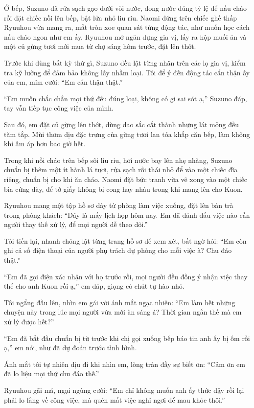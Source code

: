 \documentclass[../main.tex]{subfiles}
\begin{document}
Ở bếp, Suzuno đã rửa sạch gạo dưới vòi nước, đong nước đúng tỷ lệ để nấu cháo rồi đặt chiếc nồi lên bếp, bật lửa nhỏ liu riu. Naomi đứng trên chiếc ghế thấp Ryuuhou vừa mang ra, mắt tròn xoe quan sát từng động tác, như muốn học cách nấu cháo ngon như em ấy. Ryuuhou mở ngăn đựng gia vị, lấy ra hộp muối ăn và một củ gừng tươi mới mua từ chợ sáng hôm trước, đặt lên thớt.

Trước khi dùng bất kỳ thứ gì, Suzuno đều lật từng nhãn trên các lọ gia vị, kiểm tra kỹ lưỡng để đảm bảo không lấy nhầm loại. Tôi để ý đến động tác cẩn thận ấy của em, mỉm cười: ``Em cẩn thận thật.''

``Em muốn chắc chắn mọi thứ đều đúng loại, không có gì sai sót ạ,'' Suzuno đáp, tay vẫn tiếp tục công việc của mình.

Sau đó, em đặt củ gừng lên thớt, dùng dao sắc cắt thành những lát mỏng đều tăm tắp. Mùi thơm dịu đặc trưng của gừng tươi lan tỏa khắp căn bếp, làm không khí ấm áp hơn bao giờ hết.

\ct

Trong khi nồi cháo trên bếp sôi liu riu, hơi nước bay lên nhẹ nhàng, Suzuno chuẩn bị thêm một ít hành lá tươi, rửa sạch rồi thái nhỏ để vào một chiếc đĩa riêng, chuẩn bị cho khi ăn cháo. Naomi đặt bức tranh vừa vẽ xong vào một chiếc bìa cứng dày, để tờ giấy không bị cong hay nhàu trong khi mang lên cho Kuon. 

Ryuuhou mang một tập hồ sơ dày từ phòng làm việc xuống, đặt lên bàn trà trong phòng khách: ``Đây là mấy lịch họp hôm nay. Em đã đánh dấu việc nào cần người thay thế xử lý, để mọi người dễ theo dõi.''

Tôi tiến lại, nhanh chóng lật từng trang hồ sơ để xem xét, bất ngờ hỏi: ``Em còn ghi cả số điện thoại của người phụ trách dự phòng cho mỗi việc à? Chu đáo thật.''

``Em đã gọi điện xác nhận với họ trước rồi, mọi người đều đồng ý nhận việc thay thế cho anh Kuon rồi ạ,'' em đáp, giọng có chút tự hào nhỏ.

Tôi ngẩng đầu lên, nhìn em gái với ánh mắt ngạc nhiên: ``Em làm hết những chuyện này trong lúc mọi người vừa mới ăn sáng á? Thời gian ngắn thế mà em xử lý được hết?''

``Em đã bắt đầu chuẩn bị từ trước khi chị gọi xuống bếp báo tin anh ấy bị ốm rồi ạ,'' em nói, như đã dự đoán trước tình hình.

Ánh mắt tôi tự nhiên dịu đi khi nhìn em, lòng tràn đầy sự biết ơn: ``Cảm ơn em đã lo liệu mọi thứ chu đáo thế.''

Ryuuhou gãi má, ngại ngùng cười: ``Em chỉ không muốn anh ấy thức dậy rồi lại phải lo lắng về công việc, mà quên mất việc nghỉ ngơi để mau khỏe thôi.''
\end{document}
